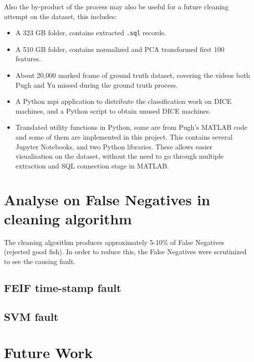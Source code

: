 \documentclass[bsc,logo,twoside,fullspacing,parskip]{infthesis}
\begin{document}
Also the by-product of the process may also be useful for a future cleaning attempt on the dataset, this includes:
\begin{itemize}
\setlength{\parskip}{3pt}
\item A 323 GB folder, contains extracted {\tt .sql} records.
\item A 510 GB folder, contains normalized and PCA transformed first 100 features.
\item About 20,000 marked frame of ground truth dataset, covering the videos both Pugh and Yu missed during the ground truth process.
\item A Python mpi application to distribute the classification work on DICE machines, and a Python script to obtain unused DICE machines.
\item Translated utility functions in Python, some are from Pugh's MATLAB code and some of them are implemented in this project. 
This contains several Jupyter Notebooks, and two Python libraries. 
These allows easier visualisation on the dataset, without the need to go through multiple extraction and SQL connection stage in MATLAB. 
\end{itemize}

\section{Analyse on False Negatives in cleaning algorithm}
\label{sec:falsenegative}

The cleaning algorithm produces approximately 5-10\% of False Negatives (rejected good fish). 
In order to reduce this, the False Negatives were scrutinized to see the causing fault.
\subsection{FEIF time-stamp fault}
\label{sec:feiffault}

\subsection{SVM fault}
\label{sec:svmfault}


\section{Future Work}
\label{sec:future}
\end{document}
